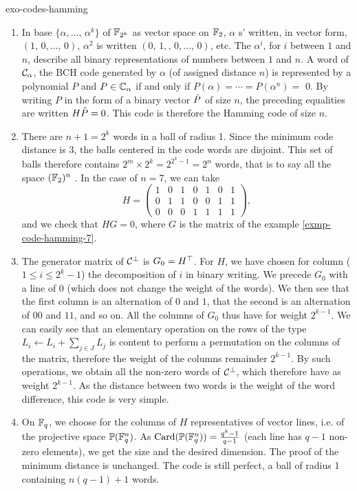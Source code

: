 \begin{correction}{exo-codes-hamming}
\begin{enumerate}
\item In base $ \{\alpha, \ldots, \, \alpha^{k}\} $ of $ \mathbb{F}_{2^k} $ as vector space on $ \mathbb{F}_2 $, $ \alpha $ s' written, in vector form, $ (1, \, 0, \ldots, \, 0) $, $ \alpha^2 $ is written $ (0, \, 1 ,, \, 0, \ldots, \, 0) $, etc. The $ \alpha^i $, for $ i $ between $ 1 $ and $ n $, describe all binary representations of numbers between $ 1 $ and $ n $. A word of $ \mathcal{C}_\alpha $, the BCH code generated by $ \alpha $ (of assigned distance $ n $) is represented by a polynomial $ P $ and $ P \in \mathbb{C}_\alpha $ if and only if $ P (\alpha) = \cdots = P (\alpha^{n}) = $ 0. By writing $ P $ in the form of a binary vector $ \tilde{P} $ of size $ n $, the preceding equalities are written $ H \tilde{P} = 0 $. This code is therefore the Hamming code of size $ n $.
\item There are $ n+1 = 2^k $ words in a ball of radius 1. Since the minimum code distance is 3, the balls centered in the code words are disjoint. This set of balls therefore contains $ 2^m \times 2^k = 2^{2^k-1} = 2^n $ words, that is to say all the space $ (\mathbb{F}_2)^n $ . In the case of $ n = 7 $, we can take
\begin{equation*}
H = \begin{pmatrix} 1 & 0 & 1 & 0 & 1 & 0 & 1 \\0 & 1 & 1 & 0 & 0 & 1 & 1 \\0 & 0 & 0 & 1 & 1 & 1 & 1 \end{pmatrix},
\end{equation*}
and we check that $ HG = 0 $, where $ G $ is the matrix of the example \ref{exmp-code-hamming-7}.
\item {} The generator matrix of $ \mathcal{C}^\bot $ is $ G_0 = H^\top $. For $ H $, we have chosen for  column ($ 1 \leq i \leq 2^k-1 $) the decomposition of $ i $ in binary writing. We precede $ G_0 $ with a line of 0 (which does not change the weight of the words). We then see that the first column is an alternation of $ 0 $ and $ 1 $, that the second is an alternation of $ 00 $ and $ 11 $, and so on. All the columns of $ G_0 $ thus have for weight $ 2^{k-1} $. We can easily see that an elementary operation on the rows of the type $ L_i \leftarrow L_i + \sum_{j \in J}{L_j} $ is content to perform a permutation on the columns of the matrix, therefore the weight of the columns remainder $ 2^{k-1} $. By such operations, we obtain all the non-zero words of $ \mathcal{C}^\bot $, which therefore have as weight $ 2^{k-1} $. As the distance between two words is the weight of the word difference, this code is very simple.
\item {} On $ \mathbb{F}_q $, we choose for the columns of $ H $ representatives of vector lines, i.e. of the projective space $ \mathbb{P} (\mathbb{F}_q^n ) $. As $ \operatorname{Card} (\mathbb{P} (\mathbb{F}_q^n)) = \frac{q^k-1}{q-1} $ (each line has $ q-1 $ non-zero elements), we get the size and the desired dimension. The proof of the minimum distance is unchanged. The code is still perfect, a ball of radius 1 containing $ n (q-1)+1 $ words.
\end{enumerate}
\end{correction}
 
